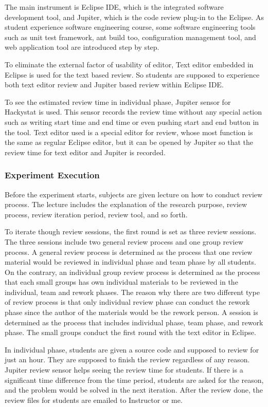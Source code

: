 The main instrument is Eclipse IDE, which is the integrated software
development tool, and Jupiter, which is the code review plug-in to
the Eclipse. As student experience software engineering course, some
software engineering tools such as unit test framework, ant build
too, configuration management tool, and web application tool are
introduced step by step.

To eliminate the external factor of usability of editor, Text editor
embedded in Eclipse is used for the text based review. So students
are supposed to experience both text editor review and Jupiter based
review within Eclipse IDE.

To see the estimated review time in individual phase, Jupiter sensor
for Hackystat is used. This sensor records the review time without
any special action such as writing start time and end time or even
pushing start and end button in the tool. Text editor used is a
special editor for review, whose most function is the same as
regular Eclipse editor, but it can be opened by Jupiter so that the
review time for text editor and Jupiter is recorded.


\subsubsection{Experiment Execution}

Before the experiment starts, subjects are given lecture on how to
conduct review process. The lecture includes the explanation of the
research purpose, review process, review iteration period, review
tool, and so forth.

To iterate though review sessions, the first round is set as three
review sessions. The three sessions include two general review
process and one group review process. A general review process is
determined as the process that one review material would be reviewed
in individual phase and team phase by all students. On the contrary,
an individual group review process is determined as the process that
each small groups has own individual materials to be reviewed in the
individual, team and rework phases. The reason why there are two
different type of review process is that only individual review
phase can conduct the rework phase since the author of the materials
would be the rework person. A session is determined as the process
that includes individual phase, team phase, and rework phase.  The
small groups conduct the first round with the text editor in
Eclipse.

In individual phase, students are given a source code and supposed
to review for just an hour. They are supposed to finish the review
regardless of any reason. Jupiter review sensor helps seeing the
review time for students. If there is a significant time difference
from the time period, students are asked for the reason, and the
problem would be solved in the next iteration. After the review
done, the review files for students are emailed to Instructor or me.

